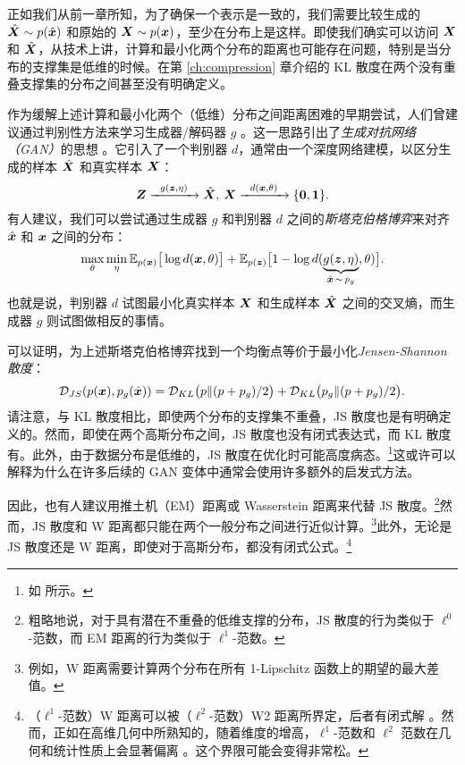 \documentclass[../../book-main_zh.tex]{subfiles}
\begin{document}
正如我们从前一章所知，为了确保一个表示是一致的，我们需要比较生成的 $\hat {\bm{X}} \sim p(\hat{\bm{x}})$ 和原始的 $\bm{X} \sim p(\bm{x})$，至少在分布上是这样。即使我们确实可以访问 $\bm{X}$ 和 $\hat {\bm{X}}$，从技术上讲，计算和最小化两个分布的距离也可能存在问题，特别是当分布的支撑集是低维的时候。在第 \ref{ch:compression} 章介绍的 KL 散度在两个没有重叠支撑集的分布之间甚至没有明确定义。

作为缓解上述计算和最小化两个（低维）分布之间距离困难的早期尝试，人们曾建议通过判别性方法来学习生成器/解码器 $g$ \cite{Tu-2007}。这一思路引出了{\em 生成对抗网络（GAN）}的思想 \cite{goodfellow2014generative}。它引入了一个判别器 $d$，通常由一个深度网络建模，以区分生成的样本 $\hat {\bm{X}}$ 和真实样本 $\bm{X}$：
\begin{equation}
 \bm{Z} \xrightarrow{\hspace{2mm} g(\bm{z},\eta) \hspace{2mm}} \hat {\bm{X}}, \, \bm{X} \xrightarrow{\hspace{2mm} d(\bm{x}, \theta)\hspace{2mm}} \{\mathbf 0, \mathbf 1\}.
 \label{eqn:GAN}
\end{equation}
有人建议，我们可以尝试通过生成器 $g$ 和判别器 $d$ 之间的{\em 斯塔克伯格博弈}来对齐 $\hat {\bm{x}}$ 和 $\bm{x}$ 之间的分布：
\begin{equation}
\max_{\theta}\min_{\eta} \mathbb{E}_{p({\bm{x}})}\big[\log d(\bm{x},\theta)\big] + \mathbb{E}_{p({\bm{z}})}\big[1 - \log d(\underbrace{g(\bm{z},\eta)}_{\hat {\bm{x}} \,\sim\, p_g},\theta)\big].
\end{equation}
也就是说，判别器 $d$ 试图最小化真实样本 $\bm{X}$ 和生成样本 $\hat {\bm{X}}$ 之间的交叉熵，而生成器 $g$ 则试图做相反的事情。

可以证明，为上述斯塔克伯格博弈找到一个均衡点等价于最小化{\em Jensen-Shannon 散度}：
\begin{equation}
    \mathcal{D}_{JS}(p(\bm{x}), p_g(\hat {\bm{x}})) = \mathcal{D}_{KL}\big(p \| (p + p_g)/{2}\big) + \mathcal{D}_{KL}\big(p_g \| (p + p_g)/{2}\big).
\end{equation}
请注意，与 KL 散度相比，即使两个分布的支撑集不重叠，JS 散度也是有明确定义的。然而，即使在两个高斯分布之间，JS 散度也没有闭式表达式，而 KL 散度有。此外，由于数据分布是低维的，JS 散度在优化时可能高度病态。\footnote{如 \cite{arjovsky2017wasserstein} 所示。}这或许可以解释为什么在许多后续的 GAN 变体中通常会使用许多额外的启发式方法。

因此，也有人建议用推土机（EM）距离或 Wasserstein 距离来代替 JS 散度。\footnote{粗略地说，对于具有潜在不重叠的低维支撑的分布，JS 散度的行为类似于 $\ell^0$-范数，而 EM 距离的行为类似于 $\ell^1$-范数。}然而，JS 散度和 W 距离都只能在两个一般分布之间进行近似计算。\footnote{例如，W 距离需要计算两个分布在所有 1-Lipschitz 函数上的期望的最大差值。}此外，无论是 JS 散度还是 W 距离，即使对于高斯分布，都没有闭式公式。\footnote{（$\ell^1$-范数）W 距离可以被（$\ell^2$-范数）W2 距离所界定，后者有闭式解 \cite{salmona2021gromovwasserstein}。然而，正如在高维几何中所熟知的，随着维度的增高，$\ell^1$-范数和 $\ell^2$ 范数在几何和统计性质上会显著偏离 \cite{Wright-Ma-2021}。这个界限可能会变得非常松。}
\end{document}
